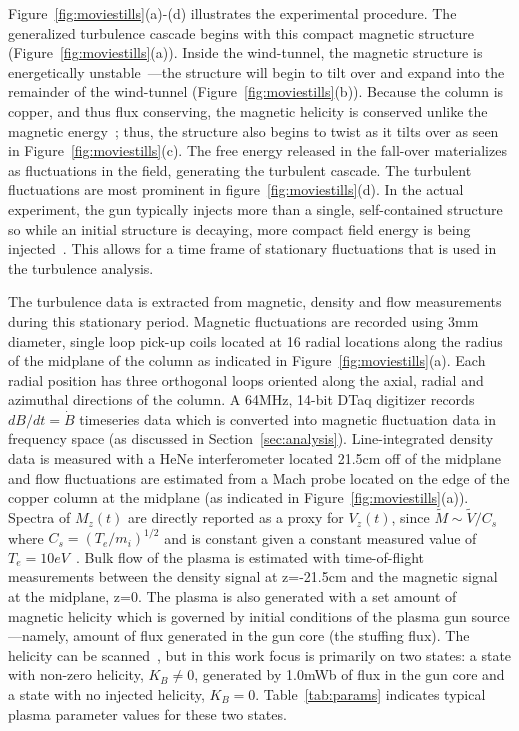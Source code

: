 \documentclass[aip,prl,amsmath,amssymb,reprint,superscriptaddress]{revtex4-1} %
\begin{document}
Figure~\ref{fig:moviestills}(a)-(d) illustrates the experimental procedure. The generalized turbulence cascade begins with this compact magnetic structure (Figure~\ref{fig:moviestills}(a)). Inside the wind-tunnel, the magnetic structure is energetically unstable~\cite{bondeson81,jarboe93}---the structure will begin to tilt over and expand into the remainder of the wind-tunnel (Figure~\ref{fig:moviestills}(b)). Because the column is copper, and thus flux conserving, the magnetic helicity is conserved unlike the magnetic energy~\cite{taylor86}; thus, the structure also begins to twist as it tilts over as seen in Figure~\ref{fig:moviestills}(c). The free energy released in the fall-over materializes as fluctuations in the field, generating the turbulent cascade. The turbulent fluctuations are most prominent in figure~\ref{fig:moviestills}(d). In the actual experiment, the gun typically injects more than a single, self-contained structure so while an initial structure is decaying, more compact field energy is being injected~\cite{barnes86}. This allows for a time frame of stationary fluctuations that is used in the turbulence analysis.

The turbulence data is extracted from magnetic, density and flow measurements during this stationary period. Magnetic fluctuations are recorded using 3mm diameter, single loop pick-up coils located at 16 radial locations along the radius of the midplane of the column as indicated in Figure~\ref{fig:moviestills}(a). Each radial position has three orthogonal loops oriented along the axial, radial and azimuthal directions of the column. A 64MHz, 14-bit DTaq digitizer records $dB/dt = \dot{B}$ timeseries data which is converted into magnetic fluctuation data in frequency space (as discussed in Section~\ref{sec:analysis}). Line-integrated density data is measured with a HeNe interferometer located 21.5cm off of the midplane and flow fluctuations are estimated from a Mach probe located on the edge of the copper column at the midplane (as indicated in Figure~\ref{fig:moviestills}(a)). Spectra of $M_{z}(t)$ are directly reported as a proxy for $V_{z}(t)$, since $\tilde{M}\sim \tilde{V}/C_{s}$ where $C_{s}=(T_{e}/m_{i})^{1/2}$ and is constant given a constant measured value of $T_{e}=10eV$~\cite{zhang11, schaffner14b}. Bulk flow of the plasma is estimated with time-of-flight measurements between the density signal at z=-21.5cm and the magnetic signal at the midplane, z=0. The plasma is also generated with a set amount of magnetic helicity which is governed by initial conditions of the plasma gun source---namely, amount of flux generated in the gun core (the stuffing flux). The helicity can be scanned~\cite{schaffner14b}, but in this work focus is primarily on two states: a state with non-zero helicity, $K_{B}\neq 0$, generated by 1.0mWb of flux in the gun core and a state with no injected helicity, $K_{B}=0$. Table~\ref{tab:params} indicates typical plasma parameter values for these two states.
\end{document}
